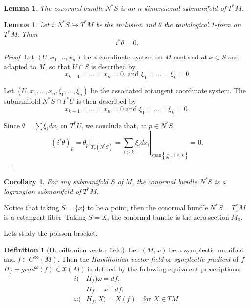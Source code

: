 \documentclass{article}
\newtheorem{lemma}[theorem]{Lemma} %
\newtheorem{corollary}[theorem]{Corollary}
\theoremstyle{definition}
\newtheorem{definition}[theorem]{Definition}
\begin{document}
\begin{lemma}
    The conormal bundle $N^*S$ is an $n$-dimensional submanifold of $T^*M$.
\end{lemma}

\begin{lemma}
    Let $i: N^*S \hookrightarrow T^*M$ be the inclusion and $\theta$ the tautological 1-form on $T^*M$. Then
    \begin{equation*}
        i^*\theta = 0.
    \end{equation*}
\end{lemma}

\begin{proof}
    Let $(U, x_1, \ldots, x_n)$ be a coordinate system on $M$ centered at $x \in S$ and adapted to $M$, so that $U \cap S$ is described by 
    \begin{equation*}
        x_{k+1} = \ldots = x_n = 0. \text{ and } \xi_1 = \ldots = \xi_k = 0
    \end{equation*}

    Let $(U, x_1, \ldots, x_n, \xi_1, \ldots, \xi_n)$ be the associated cotangent coordinate system. The submanifold $N^*S \cap T^*U$ is then described by
    \begin{equation}
        x_{k+1} = \ldots = x_n = 0 \text{ and } \xi_1 = \ldots = \xi_k = 0.
    \end{equation}

    Since $\theta = \sum \xi_i dx_i$ on $T^*U$, we conclude that, at $p \in N^*S$,
    \begin{equation}
        (i^* \theta)_p = \theta_p|_{T_p(N^*S)} = \left. \sum_{i > k} \xi_i dx_i \right|_{\mathrm{span}\left\{\frac{\partial}{\partial x_i}, i \leq k \right\}} = 0.
    \end{equation}
\end{proof}

\begin{corollary}
    For any submanifold $S$ of $M$, the conormal bundle $N^*S$ is a lagrangian submanifold of $T^*M$.
\end{corollary}

Notice that taking $S = \{x\}$ to be a point, then the conormal bundle $N^*S = T^*_xM$ is a cotangent fiber. Taking $S = X$, the conormal bundle is the zero section $M_0$.

Lets study the poisson bracket.

\begin{definition}[Hamiltonian vector field]
    Let $(M,\omega)$ be a symplectic manifold and $f \in C^\infty(M)$. Then the \textit{Hamiltonian vector field} or \textit{symplectic gradient} of $f$ $H_f = grad^\omega(f) \in \mathfrak{X}(M)$ is defined by the following equivalent prescriptions:
    \begin{equation*}
        \begin{split}
            i(&H_f)\omega = df,\\
            \quad &H_f = \omega^{-1} df, \\
            \omega(&H_f, X) = X(f) \quad \text{for } X \in TM.  
        \end{split}
    \end{equation*}
\end{definition}
\end{document}
